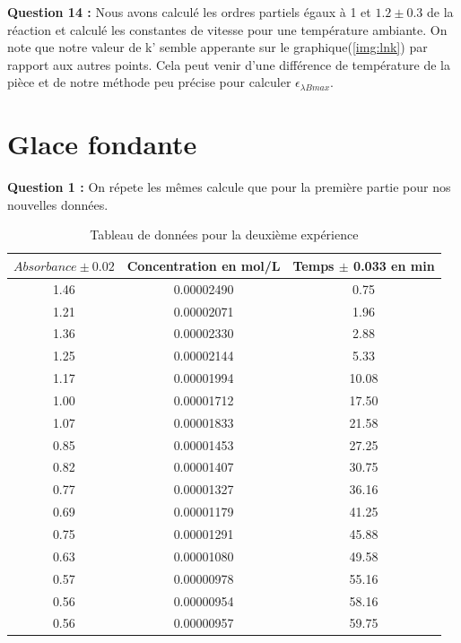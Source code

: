 \documentclass[12pt]{article}
\begin{document}
\textbf{Question 14 :} Nous avons calculé les ordres partiels égaux à 1 et $1.2\pm 0.3$ de la réaction et calculé les constantes de vitesse pour une température ambiante. 
On note que notre valeur de k' semble apperante sur le graphique(\ref{img:lnk}) par rapport aux autres points.
Cela peut venir d'une différence de température de la pièce et de notre méthode peu précise pour calculer $\epsilon_{\lambda Bmax}$. 

\newpage
\section{Glace fondante}
\textbf{Question 1 :} On répete les mêmes calcule que pour la première partie pour nos nouvelles données.
\begin{table}[h!]
    \begin{center}
        \begin{tabular}{|c|c|c|}
            \hline
        $Absorbance \pm 0.02 $ & Concentration en mol/L & Temps $\pm$ 0.033 en min \\
            \hline
                        1.46 &             0.00002490 &             0.75 \\
                        1.21 &             0.00002071 &             1.96 \\
                        1.36 &             0.00002330 &             2.88 \\
                        1.25 &             0.00002144 &             5.33 \\
                        1.17 &             0.00001994 &            10.08 \\
                        1.00 &             0.00001712 &            17.50 \\
                        1.07 &             0.00001833 &            21.58 \\
                        0.85 &             0.00001453 &            27.25 \\
                        0.82 &             0.00001407 &            30.75 \\
                        0.77 &             0.00001327 &            36.16 \\
                        0.69 &             0.00001179 &            41.25 \\
                        0.75 &             0.00001291 &            45.88 \\
                        0.63 &             0.00001080 &            49.58 \\
                        0.57 &             0.00000978 &            55.16 \\
                        0.56 &             0.00000954 &            58.16 \\
                        0.56 &             0.00000957 &            59.75 \\
            \hline
            \end{tabular}
    \end{center}
    \caption{Tableau de données pour la deuxième expérience}
\end{table}
\end{document}
